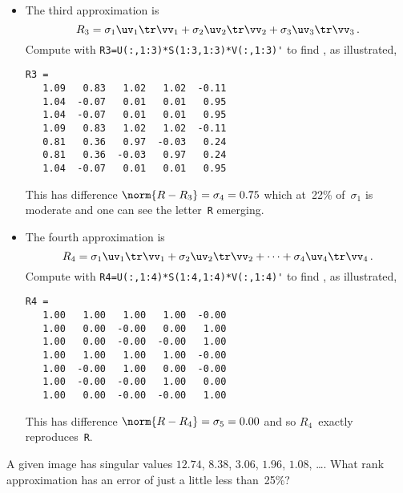 \begin{example}
\begin{solution}
\begin{itemize}
\item The third approximation is 
\begin{equation*}
R_3=\sigma_1\uv_1\tr\vv_1 +\sigma_2\uv_2\tr\vv_2 +\sigma_3\uv_3\tr\vv_3\,.
\end{equation*}
Compute with \verb|R3=U(:,1:3)*S(1:3,1:3)*V(:,1:3)'| to find \twodp, as illustrated, 
\marginpar{}
\begin{verbatim}
R3 =
   1.09   0.83   1.02   1.02  -0.11
   1.04  -0.07   0.01   0.01   0.95
   1.04  -0.07   0.01   0.01   0.95
   1.09   0.83   1.02   1.02  -0.11
   0.81   0.36   0.97  -0.03   0.24
   0.81   0.36  -0.03   0.97   0.24
   1.04  -0.07   0.01   0.01   0.95
\end{verbatim}
This has difference \(\norm{R-R_3}=\sigma_4=0.75\) which at~22\% of~\(\sigma_1\) is moderate and one can see the letter~\verb|R| emerging.
 
\item The fourth approximation is 
\begin{equation*}
R_4=\sigma_1\uv_1\tr\vv_1+\sigma_2\uv_2\tr\vv_2+\cdots+\sigma_4\uv_4\tr\vv_4\,.
\end{equation*}
Compute with \verb|R4=U(:,1:4)*S(1:4,1:4)*V(:,1:4)'| to find \twodp, as illustrated, 
\marginpar{}
\begin{verbatim}
R4 =
   1.00   1.00   1.00   1.00  -0.00
   1.00   0.00  -0.00   0.00   1.00
   1.00   0.00  -0.00  -0.00   1.00
   1.00   1.00   1.00   1.00  -0.00
   1.00  -0.00   1.00   0.00  -0.00
   1.00  -0.00  -0.00   1.00   0.00
   1.00   0.00  -0.00  -0.00   1.00
\end{verbatim}
This has difference \(\norm{R-R_4}=\sigma_5=0.00\) and so \(R_4\)~exactly reproduces~\verb|R|.
 
\end{itemize}
\end{solution}
\end{example}




\begin{activity}
A given image has singular values \(12.74\), \(8.38\), \(3.06\), \(1.96\), \(1.08\), \ldots. 
What rank approximation has an error of just a little less than~25\%?
\end{activity}





